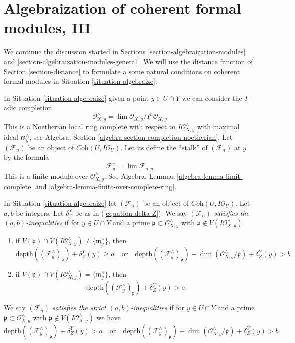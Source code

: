 \section{Algebraization of coherent formal modules, III}
\label{section-uniqueness}

\noindent
We continue the discussion started in Sections
\ref{section-algebraization-modules} and
\ref{section-algebraization-modules-general}.
We will use the distance function of Section \ref{section-distance}
to formulate a some natural conditions on
coherent formal modules in Situation \ref{situation-algebraize}.

\medskip\noindent
In Situation \ref{situation-algebraize} given a point $y \in U \cap Y$
we can consider the $I$-adic completion
$$
\mathcal{O}_{X, y}^\wedge = \lim \mathcal{O}_{X, y}/I^n\mathcal{O}_{X, y}
$$
This is a Noetherian local ring complete with respect to
$I\mathcal{O}_{X, y}^\wedge$ with maximal ideal $\mathfrak m_y^\wedge$, see
Algebra, Section \ref{algebra-section-completion-noetherian}.
Let $(\mathcal{F}_n)$ be an object of $\textit{Coh}(U, I\mathcal{O}_U)$.
Let us define the ``stalk'' of $(\mathcal{F}_n)$ at $y$ by the formula
$$
\mathcal{F}_y^\wedge = \lim \mathcal{F}_{n, y}
$$
This is a finite module over $\mathcal{O}_{X, y}^\wedge$. See
Algebra, Lemmas \ref{algebra-lemma-limit-complete} and
\ref{algebra-lemma-finite-over-complete-ring}.

\begin{definition}
\label{definition-s-d-inequalities}
In Situation \ref{situation-algebraize} let $(\mathcal{F}_n)$ be an object
of $\textit{Coh}(U, I\mathcal{O}_U)$. Let $a, b$ be integers.
Let $\delta^Y_Z$ be as in (\ref{equation-delta-Z}).
We say
{\it $(\mathcal{F}_n)$ satisfies the $(a, b)$-inequalities} if for
$y \in U \cap Y$ and a prime $\mathfrak p \subset \mathcal{O}_{X, y}^\wedge$
with $\mathfrak p \not \in V(I\mathcal{O}_{X, y}^\wedge)$
\begin{enumerate}
\item if $V(\mathfrak p) \cap V(I\mathcal{O}_{X, y}^\wedge) \not =
\{\mathfrak m_y^\wedge\}$, then
$$
\text{depth}((\mathcal{F}^\wedge_y)_\mathfrak p) + \delta^Y_Z(y) \geq a
\quad\text{or}\quad
\text{depth}((\mathcal{F}^\wedge_y)_\mathfrak p) +
\dim(\mathcal{O}_{X, y}^\wedge/\mathfrak p) + \delta^Y_Z(y) > b
$$
\item if $V(\mathfrak p) \cap V(I\mathcal{O}_{X, y}^\wedge) =
\{\mathfrak m_y^\wedge\}$, then
$$
\text{depth}((\mathcal{F}^\wedge_y)_\mathfrak p) + \delta^Y_Z(y) > a
$$
\end{enumerate}
We say {\it $(\mathcal{F}_n)$ satisfies the strict $(a, b)$-inequalities}
if for $y \in U \cap Y$ and a prime
$\mathfrak p \subset \mathcal{O}_{X, y}^\wedge$ with
$\mathfrak p \not \in V(I\mathcal{O}_{X, y}^\wedge)$
we have
$$
\text{depth}((\mathcal{F}^\wedge_y)_\mathfrak p) + \delta^Y_Z(y) > a
\quad\text{or}\quad
\text{depth}((\mathcal{F}^\wedge_y)_\mathfrak p) +
\dim(\mathcal{O}_{X, y}^\wedge/\mathfrak p) + \delta^Y_Z(y) > b
$$
\end{definition}

